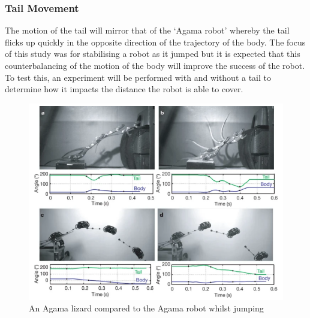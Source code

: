 \documentclass{article}
\begin{document}
\subsubsection{Tail Movement}
The motion of the tail will mirror that of the ‘Agama robot’ whereby the tail flicks up quickly in the opposite direction of the trajectory of the body.  The focus of this study was for stabilising a robot as it jumped but it is expected that this counterbalancing of the motion of the body will improve the success of the robot. To test this, an experiment will be performed with and without a tail to determine how it impacts the distance the robot is able to cover. 
\begin{figure}[H]
\centering
\includegraphics[scale=0.6]{agamaJump}
\caption{An Agama lizard compared to the Agama robot whilst jumping \citep{agama}}
\end{figure}
\end{document}
